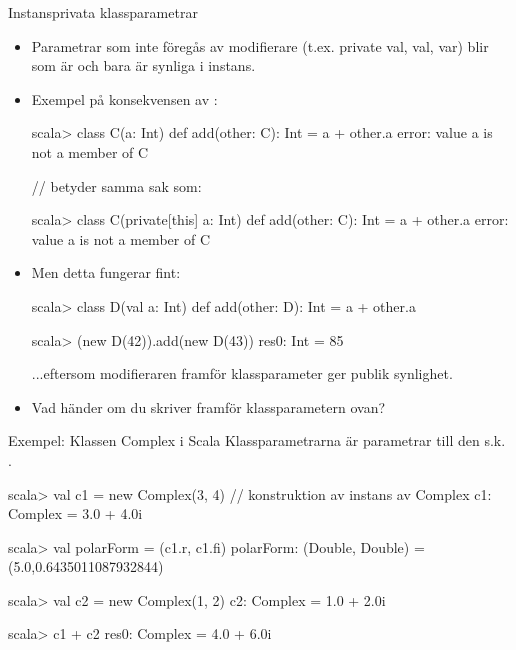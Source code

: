 \begin{Slide}{Instansprivata klassparametrar}\SlideFontSmall
\setlength{\leftmargini}{0pt}

\begin{itemize}
\item Parametrar som inte föregås av modifierare (t.ex. private val, val, var) blir  som är  och bara är synliga i  instans.
\item Exempel på konsekvensen av :
\begin{REPL}
scala> class C(a: Int){ def add(other: C): Int = a + other.a }
error: value a is not a member of C

// betyder samma sak som:

scala> class C(private[this] a: Int){ def add(other: C): Int = a + other.a }
error: value a is not a member of C
\end{REPL}
\item Men detta fungerar fint:
\begin{REPL}
scala> class D(val a: Int){ def add(other: D): Int = a + other.a }

scala> (new D(42)).add(new D(43))
res0: Int = 85
\end{REPL}
...eftersom modifieraren  framför klassparameter ger publik synlighet.
\item Vad händer om du skriver  framför klassparametern  ovan?
\end{itemize}
\end{Slide}





\begin{Slide}{Exempel: Klassen Complex i Scala}\SlideFontSmall
{}
Klassparametrarna är parametrar till den s.k. .
\begin{REPL}
scala> val c1 = new Complex(3, 4)  // konstruktion av instans av Complex
c1: Complex = 3.0 + 4.0i

scala> val polarForm = (c1.r, c1.fi)
polarForm: (Double, Double) = (5.0,0.6435011087932844)

scala> val c2 = new Complex(1, 2)
c2: Complex = 1.0 + 2.0i

scala> c1 + c2
res0: Complex = 4.0 + 6.0i
\end{REPL}
\end{Slide}




